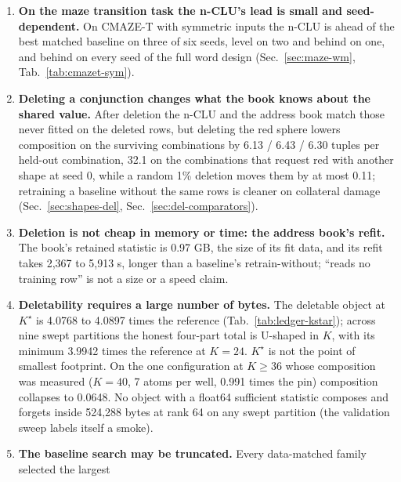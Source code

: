 \documentclass{article} %
\newcommand{\Kstar}{\ensuremath{K^{\star}}}
\begin{document}
\begin{enumerate}
\item \textbf{On the maze transition task the n-CLU's lead is small and seed-dependent.}
  On CMAZE-T with symmetric inputs the n-CLU is ahead of the best matched baseline on three of six seeds,
  level on two and behind on one, and behind on every seed of the full word design %
  (Sec.~\ref{sec:maze-wm}, Tab.~\ref{tab:cmazet-sym}).
\item \textbf{Deleting a conjunction changes what the book knows about the shared value.} After deletion
  the n-CLU and the address book match those never fitted on the deleted rows, but deleting the red
  sphere lowers composition on
  the surviving combinations by 6.13 / 6.43 / 6.30 tuples per held-out combination, 32.1 on the combinations that request red %
  with another shape at seed 0, while a random 1\% deletion moves them by at most 0.11; retraining a %
  baseline without the same rows is cleaner on collateral damage (Sec.~\ref{sec:shapes-del},
  Sec.~\ref{sec:del-comparators}).
\item \textbf{Deletion is not cheap in memory or time: the address book's refit.} The book's retained statistic is 0.97 GB, %
  the size of its fit data, and its refit takes 2,367 to 5,913 s, longer than a baseline's %
  retrain-without; ``reads no training row'' is not a size or a speed claim.
\item \textbf{Deletability requires a large number of bytes.} The deletable object at $\Kstar$ is 4.0768 to 4.0897
  times the reference (Tab.~\ref{tab:ledger-kstar}); across nine swept partitions the honest
  four-part total is U-shaped in $K$, with its minimum 3.9942 times the reference at $K=24$.
  $\Kstar$ is not the point of smallest footprint. On the one configuration at $K\ge36$ whose composition
  was measured ($K=40$, 7 atoms per well, 0.991 times the pin) composition collapses to 0.0648.
  No object with a float64 sufficient statistic composes and forgets inside 524,288 bytes at rank
  64 on any swept partition (the validation sweep labels itself a smoke).
\item \textbf{The baseline search may be truncated.} Every data-matched family selected the largest

\end{enumerate}
\end{document}
